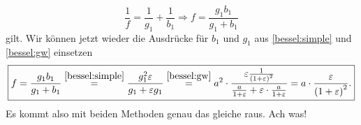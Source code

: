 \begin{Answer}[ref = ipho20170402]
\begin{equation}
		\frac{1}{f} = \frac{1}{g_1} + \frac{1}{b_1} \Rightarrow f = \frac{g_1b_1}{g_1+b_1}
	\end{equation}
	gilt. Wir können jetzt wieder die Ausdrücke für $b_1$ und $g_1$ aus \eqref{bessel:simple}  und \eqref{bessel:gw} einsetzen
	\begin{equation}\boxed{
		f = \frac{g_1 b_1}{g_1+b_1} \overset{\eqref{bessel:simple}}{=}  \frac{g_1^2\varepsilon}{g_1+\varepsilon g_1} \overset{\eqref{bessel:gw}}{=} a^2\cdot \frac{\varepsilon\frac{1}{\left(1+\varepsilon\right)^2}}{\frac{a}{1+\varepsilon}+\varepsilon \cdot \frac{a}{1+\varepsilon}} = a\cdot \frac{\varepsilon}{\left(1+\varepsilon\right)^2}.}
	\end{equation}
	Es kommt also mit beiden Methoden genau das gleiche raus. Ach was!
	

\end{Answer}